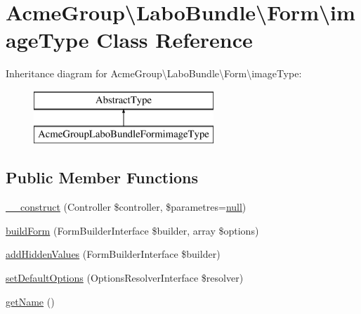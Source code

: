 \hypertarget{class_acme_group_1_1_labo_bundle_1_1_form_1_1image_type}{\section{Acme\+Group\textbackslash{}Labo\+Bundle\textbackslash{}Form\textbackslash{}image\+Type Class Reference}
\label{class_acme_group_1_1_labo_bundle_1_1_form_1_1image_type}
}
Inheritance diagram for Acme\+Group\textbackslash{}Labo\+Bundle\textbackslash{}Form\textbackslash{}image\+Type\+:\begin{figure}[H]
\begin{center}
\leavevmode
\includegraphics[height=2.000000cm]{class_acme_group_1_1_labo_bundle_1_1_form_1_1image_type}
\end{center}
\end{figure}
\subsection*{Public Member Functions}
\begin{DoxyCompactItemize}
\item 
\hyperlink{class_acme_group_1_1_labo_bundle_1_1_form_1_1image_type_ab425760492baf237e2e77678777ca608}{\+\_\+\+\_\+construct} (Controller \$controller, \$parametres=\hyperlink{validate_8js_afb8e110345c45e74478894341ab6b28e}{null})
\item 
\hyperlink{class_acme_group_1_1_labo_bundle_1_1_form_1_1image_type_a18f63fc44cfe64bd5a5b7060a2388510}{build\+Form} (Form\+Builder\+Interface \$builder, array \$options)
\item 
\hyperlink{class_acme_group_1_1_labo_bundle_1_1_form_1_1image_type_a9e3abfb9cc79979a7190afecd200ae69}{add\+Hidden\+Values} (Form\+Builder\+Interface \$builder)
\item 
\hyperlink{class_acme_group_1_1_labo_bundle_1_1_form_1_1image_type_a07fc2ca07ac32749a434d3b8d9589ebb}{set\+Default\+Options} (Options\+Resolver\+Interface \$resolver)
\item 
\hyperlink{class_acme_group_1_1_labo_bundle_1_1_form_1_1image_type_ab7d1ec48b7c45f0e0a681a1251790431}{get\+Name} ()
\end{DoxyCompactItemize}


